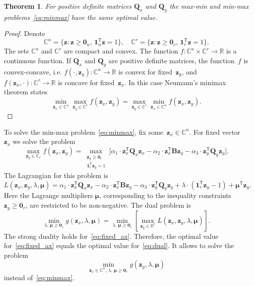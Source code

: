 \documentclass[12pt,oneside]{article}
\newtheorem{theorem}{Theorem}
\theoremstyle{definition}
\newcommand{\bz}{\mathbf{z}}
\newcommand{\bB}{\mathbf{B}}
\newcommand{\bQ}{\mathbf{Q}}
\newcommand{\bbR}{\mathbb{R}}
\newcommand{\T}{\mathsf{T}}
\newcommand{\bmu}{\boldsymbol{\mu}}
\newcommand{\bOne}{\boldsymbol{1}}
\newcommand{\bZero}{\boldsymbol{0}}
\begin{document}
\begin{theorem}
	For positive definite matrices $\bQ_x$ and $\bQ_y$ the max-min and min-max problems~\eqref{eq:minmax} have the same optimal value.
\end{theorem}
\begin{proof}
	Denote
	\begin{equation}
	\mathbb{C}^n = \{\bz : \bz \geq \bZero_n, \, \bOne_n^{\T}\bz=1\}, \quad \mathbb{C}^r = \{\bz : \bz \geq \bZero_r, \, \bOne_r^{\T}\bz=1\}.
	\end{equation}
	The sets $\mathbb{C}^n$ and $\mathbb{C}^r$ are compact and convex. The function $f: \mathbb{C}^n \times \mathbb{C}^r \rightarrow \bbR$ is a continuous function. If $\bQ_x$ and $\bQ_y$ are positive definite matrices, the function~$f$ is convex-concave, i.e.
	$f(\cdot, \bz_y): \mathbb{C}^n \rightarrow \bbR$ is convex for fixed~$\bz_y$, and $f(\bz_x, \cdot): \mathbb{C}^r \rightarrow \bbR$ is concave for fixed~$\bz_x$.
	In this case Neumann's minimax theorem states
	\begin{equation}
	\min_{\bz_x \in \mathbb{C}^n} \max_{\bz_y \in \mathbb{C}^r} f(\bz_x, \bz_y) = \max_{\bz_y \in \mathbb{C}^r} \min_{\bz_x\in \mathbb{C}^n} f(\bz_x, \bz_y).
	\end{equation}
\end{proof}

To solve the min-max problem~\eqref{eq:minmax}, fix some~$\bz_x \in \mathbb{C}^n$. For fixed vector~$\bz_x$ we solve the problem
\begin{equation}
	\max_{\bz_y \in \mathbb{C}_r} f(\bz_x, \bz_y) = \max_{\substack{\bz_y \geq \bZero_r \\ \bOne_r^{\T}\bz_y=1}} \bigl[\alpha_1 \cdot \bz_x^{\T} \bQ_x \bz_x - \alpha_2 \cdot \bz_x^{\T} \bB \bz_y - \alpha_3 \cdot \bz_y^{\T} \bQ_y \bz_y \bigr].
	\label{eq:fixed_ax}
\end{equation}
The Lagrangian for this problem is
\begin{equation}
	L(\bz_x, \bz_y, \lambda, \bmu) = \alpha_1 \cdot \bz_x^{\T} \bQ_x \bz_x - \alpha_2 \cdot \bz_x^{\T} \bB \bz_y - \alpha_3 \cdot \bz_y^{\T} \bQ_y \bz_y + \lambda \cdot  (\bOne_r^{\T} \bz_y - 1) + \bmu^{\T} \bz_y.
\end{equation}
Here the Lagrange multipliers $\bmu$, corresponding to the inequality constraints $\bz_y \geq \bZero_r$, are restricted to be non-negative.
The dual problem is
\begin{equation}
	\min_{\lambda, \, \bmu \geq \bZero_r} g(\bz_x, \lambda, \bmu) = \min_{\lambda, \, \bmu \geq \bZero_r}  \left[\max_{\bz_y \in \bbR^r} L(\bz_x, \bz_y, \lambda, \bmu) \right].
	\label{eq:dual}
\end{equation}
The strong duality holds for~\eqref{eq:fixed_ax}. Therefore, the optimal value for~\eqref{eq:fixed_ax} equals the optimal value for~\eqref{eq:dual}. It allows to solve the problem
\begin{equation}
	\min_{\bz_x \in \mathbb{C}^n, \, \lambda, \, \bmu \geq \bZero_r} g(\bz_y, \lambda, \bmu)
	\label{eq:dual_maxmin}
\end{equation}
instead of~\eqref{eq:minmax}.
\end{document}
